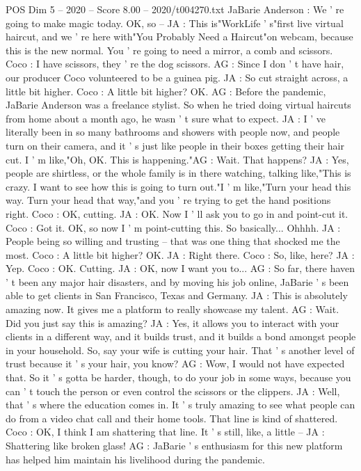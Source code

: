 \begin{textsample}{POS Dim 5 – 2020 – Score 8.00 – 2020/t004270.txt}
JaBarie Anderson : We ' re going to make magic today.
OK, so -- JA : This is"WorkLife ' s"first live virtual haircut, and we ' re here with"You Probably Need a Haircut"on webcam, because this is the new normal.
You ' re going to need a mirror, a comb and scissors.
Coco : I have scissors, they ' re the dog scissors.
AG : Since I don ' t have hair, our producer Coco volunteered to be a guinea pig.
JA : So cut straight across, a little bit higher.
Coco : A little bit higher?
OK.
AG : Before the pandemic, JaBarie Anderson was a freelance stylist.
So when he tried doing virtual haircuts from home about a month ago, he wasn ' t sure what to expect.
JA : I ' ve literally been in so many bathrooms and showers with people now, and people turn on their camera, and it ' s just like people in their boxes getting their hair cut.
I ' m like,"Oh, OK.
This is happening."AG : Wait.
That happens?
JA : Yes, people are shirtless, or the whole family is in there watching, talking like,"This is crazy.
I want to see how this is going to turn out."I ' m like,"Turn your head this way.
Turn your head that way,"and you ' re trying to get the hand positions right.
Coco : OK, cutting.
JA : OK.
Now I ' ll ask you to go in and point-cut it.
Coco : Got it.
OK, so now I ' m point-cutting this.
So basically...
Ohhhh.
JA : People being so willing and trusting -- that was one thing that shocked me the most.
Coco : A little bit higher?
OK.
JA : Right there.
Coco : So, like, here?
JA : Yep.
Coco : OK.
Cutting.
JA : OK, now I want you to...
AG : So far, there haven ' t been any major hair disasters, and by moving his job online, JaBarie ' s been able to get clients in San Francisco, Texas and Germany.
JA : This is absolutely amazing now.
It gives me a platform to really showcase my talent.
AG : Wait.
Did you just say this is amazing?
JA : Yes, it allows you to interact with your clients in a different way, and it builds trust, and it builds a bond amongst people in your household.
So, say your wife is cutting your hair.
That ' s another level of trust because it ' s your hair, you know?
AG : Wow, I would not have expected that.
So it ' s gotta be harder, though, to do your job in some ways, because you can ' t touch the person or even control the scissors or the clippers.
JA : Well, that ' s where the education comes in.
It ' s truly amazing to see what people can do from a video chat call and their home tools.
That line is kind of shattered.
Coco : OK, I think I am shattering that line.
It ' s still, like, a little -- JA : Shattering like broken glass!
AG : JaBarie ' s enthusiasm for this new platform has helped him maintain his livelihood during the pandemic.

\end{textsample}
